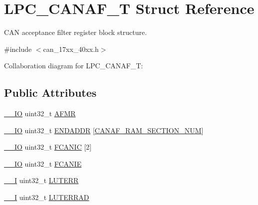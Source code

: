 \hypertarget{structLPC__CANAF__T}{}\section{L\+P\+C\+\_\+\+C\+A\+N\+A\+F\+\_\+T Struct Reference}
\label{structLPC__CANAF__T}


C\+AN acceptance filter register block structure.  




{\ttfamily \#include $<$can\+\_\+17xx\+\_\+40xx.\+h$>$}



Collaboration diagram for L\+P\+C\+\_\+\+C\+A\+N\+A\+F\+\_\+T\+:
\subsection*{Public Attributes}
\begin{DoxyCompactItemize}
\item 
\hyperlink{core__cm3_8h_aec43007d9998a0a0e01faede4133d6be}{\+\_\+\+\_\+\+IO} uint32\+\_\+t \hyperlink{structLPC__CANAF__T_a987f2996cd4432665a2cbde52251f429}{A\+F\+MR}
\item 
\hyperlink{core__cm3_8h_aec43007d9998a0a0e01faede4133d6be}{\+\_\+\+\_\+\+IO} uint32\+\_\+t \hyperlink{structLPC__CANAF__T_ab62d75d561c2446b4ac8ce383e566498}{E\+N\+D\+A\+D\+DR} \mbox{[}\hyperlink{group__CAN__17XX__40XX_ggaf0ae33e71a7acfc561972811aa1207e8a367c14b1175c83cd2ed218b1cb23b010}{C\+A\+N\+A\+F\+\_\+\+R\+A\+M\+\_\+\+S\+E\+C\+T\+I\+O\+N\+\_\+\+N\+UM}\mbox{]}
\item 
\hyperlink{core__cm3_8h_aec43007d9998a0a0e01faede4133d6be}{\+\_\+\+\_\+\+IO} uint32\+\_\+t \hyperlink{structLPC__CANAF__T_a89079a08d1150a7761dff98d0130d7e5}{F\+C\+A\+N\+IC} \mbox{[}2\mbox{]}
\item 
\hyperlink{core__cm3_8h_aec43007d9998a0a0e01faede4133d6be}{\+\_\+\+\_\+\+IO} uint32\+\_\+t \hyperlink{structLPC__CANAF__T_aca9607036e23ed6523777c80e1ab1147}{F\+C\+A\+N\+IE}
\item 
\hyperlink{core__cm3_8h_af63697ed9952cc71e1225efe205f6cd3}{\+\_\+\+\_\+I} uint32\+\_\+t \hyperlink{structLPC__CANAF__T_acd4acbf7638e632b78feaccdba530c88}{L\+U\+T\+E\+RR}
\item 
\hyperlink{core__cm3_8h_af63697ed9952cc71e1225efe205f6cd3}{\+\_\+\+\_\+I} uint32\+\_\+t \hyperlink{structLPC__CANAF__T_ac98a6bb03e4031fbfee27c49b884fddd}{L\+U\+T\+E\+R\+R\+AD}
\end{DoxyCompactItemize}


